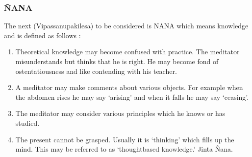 \documentclass[a5paper,10pt,english]{book}
\begin{document}
\subsubsection{ÑANA}
\label{\detokenize{progress:nana}}
\sphinxAtStartPar
The next (Vipassanupakilesa) to be considered is NANA which means knowledge and is defined as follows :\sphinxhyphen{}
\begin{enumerate}
%
\item {} 
\sphinxAtStartPar
Theoretical knowledge may become confused with practice. The meditator misunderstands but thinks that he is right. He may become fond of ostentatiousness and like contending with his teacher.

\item {} 
\sphinxAtStartPar
A meditator may make comments about various objects. For example when the abdomen rises he may say ‘arising’ and when it falls he may say ‘ceasing’.

\item {} 
\sphinxAtStartPar
The meditator may consider various principles which he knows or has studied.

\item {} 
\sphinxAtStartPar
The present cannot be grasped. Usually it is ‘thinking’ which fills up the mind. This may be referred to as ‘thought\sphinxhyphen{}based knowledge.’ Jinta Ñana.

\end{enumerate}
\end{document}
